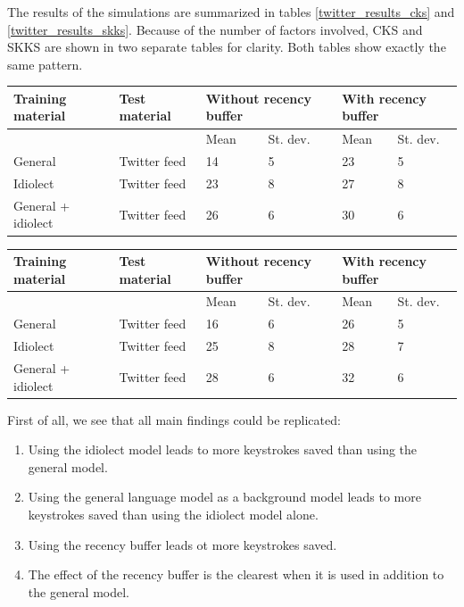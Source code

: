 \documentclass[12pt]{article}
\let\originaltable\table
\let\endoriginaltable\endtable
\renewenvironment{table}[1][ht]{%
  \originaltable[#1]
  \centering}%
  {\endoriginaltable}
\begin{document}
The results of the simulations are summarized in tables \ref{twitter_results_cks} and \ref{twitter_results_skks}. Because of the number of factors involved, CKS and SKKS are shown in two separate tables for clarity. Both tables show exactly the same pattern.

\begin{table}[H] 
\centering
\begin{tabular}{ll|llll} 
Training material&Test material&\multicolumn{2}{l}{Without recency buffer}&\multicolumn{2}{l}{With recency buffer}\\
\hline
&&Mean&St. dev.&Mean&St. dev.\\
General&Twitter feed&14&5&23&5\\
Idiolect&Twitter feed&23&8&27&8\\
General + idiolect&Twitter feed&26&6&30&6\\
\end{tabular} 
\caption{Mean percentage of keystrokes saved (\textbf{CKS}) and standard deviations for all module set-ups.} \label{twitter_results_cks}
\end{table}

\begin{table}[H] 
\centering
\begin{tabular}{ll|llll} 
Training material&Test material&\multicolumn{2}{l}{Without recency buffer}&\multicolumn{2}{l}{With recency buffer}\\
\hline
&&Mean&St. dev.&Mean&St. dev.\\
General&Twitter feed&16&6&26&5\\
Idiolect&Twitter feed&25&8&28&7\\
General + idiolect&Twitter feed&28&6&32&6\\
\end{tabular} 
\caption{Mean percentage of keystrokes saved (\textbf{SKKS}) and standard deviations for all module set-ups.} \label{twitter_results_skks}
\end{table}

First of all, we see that all main findings could be replicated: 

\begin{enumerate}
\item Using the idiolect model leads to more keystrokes saved than using the general model.
\item Using the general language model as a background model leads to more keystrokes saved than using the idiolect model alone.
\item Using the recency buffer leads ot more keystrokes saved.
\item The effect of the recency buffer is the clearest when it is used in addition to the general model.
\end{enumerate}
\end{document}
